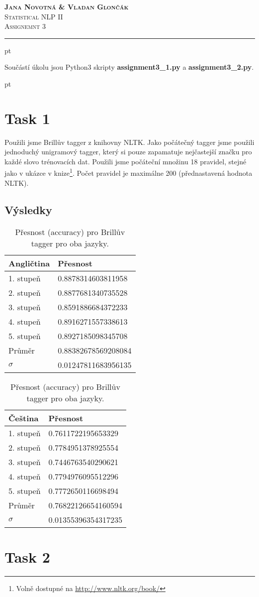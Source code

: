 \documentclass[a4paper, 10.5pt]{article}
\begin{document}
\noindent
\large\textsc{\textbf{Jana Novotná \& Vladan Glončák}}  \\
\normalsize \textsc{Statistical NLP II}\\
\textsc{Assignemnt 3}

\noindent\rule[0.5ex]{\linewidth}{1pt}

\newcommand{\norm}[1]{\left\lVert#1\right\rVert}

 pt

Součástí úkolu jsou Python3 skripty \textbf{assignment3\_1.py} a \textbf{assignment3\_2.py}.

 pt

\section*{Task 1}

Použili jsme Brillův tagger z knihovny NLTK.
Jako počátečný tagger jsme použili jednoduchý unigramový tagger, který si pouze zapamatuje nejčastejší značku pro každé slovo trénovacích dat.
Použili jsme počáteční množinu 18 pravidel, stejné jako v ukázce v knize\footnote{Volně dostupné na \url{http://www.nltk.org/book/}}. Počet pravidel je maximálne 200 (přednastavená hodnota NLTK).

\subsection*{Výsledky}

\vskip 10pt

\begin{table}[H]
\centering
\begin{tabular}{ll}
\toprule
\textbf{Angličtina} & \textbf{Přesnost} \\
\midrule
1. stupeň & 0.8878314603811958 \\
2. stupeň & 0.8877681340735528 \\
3. stupeň & 0.8591886684372233 \\
4. stupeň & 0.8916271557338613 \\
5. stupeň & 0.8927185098345708 \\
\midrule
Průměr   & 0.88382678569208084 \\
$\sigma$ & 0.01247811683956135 \\
\bottomrule
\end{tabular}
\hskip 50pt
\begin{tabular}{ll}
\toprule
\textbf {Čeština} & \textbf{Přesnost} \\
\midrule
1. stupeň & 0.7611722195653329 \\
2. stupeň & 0.7784951378925554 \\
3. stupeň & 0.7446763540290621 \\
4. stupeň & 0.7794976095512296 \\
5. stupeň & 0.7772650116698494 \\
\midrule
Průměr   & 0.76822126654160594 \\
$\sigma$ & 0.01355396354317235 \\
\bottomrule
\end{tabular}
\caption{Přesnost (accuracy) pro Brillův tagger pro oba jazyky.}
\label{eng_big}
\end{table}

\section*{Task 2}
\end{document}
